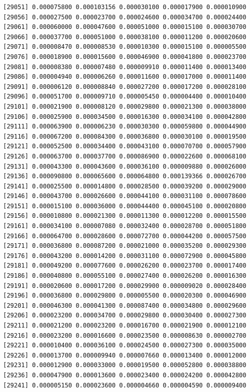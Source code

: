 \documentclass[]{article}
\begin{document}
\begin{verbatim}
[29051] 0.000075800 0.000103156 0.000030100 0.000017900 0.000010900
[29056] 0.000027500 0.000023700 0.000024600 0.000034700 0.000024400
[29061] 0.000060000 0.000047600 0.000051000 0.000015100 0.000030700
[29066] 0.000037700 0.000051000 0.000038100 0.000011200 0.000020600
[29071] 0.000008470 0.000008530 0.000010300 0.000015100 0.000005500
[29076] 0.000018900 0.000015600 0.000046900 0.000041800 0.000023700
[29081] 0.000008380 0.000007480 0.000009910 0.000011400 0.000013400
[29086] 0.000004940 0.000006260 0.000011600 0.000017000 0.000011400
[29091] 0.000006120 0.000008840 0.000027200 0.000017200 0.000028100
[29096] 0.000051700 0.000009710 0.000005450 0.000004400 0.000010400
[29101] 0.000021900 0.000008120 0.000029800 0.000021300 0.000038000
[29106] 0.000025900 0.000034500 0.000016300 0.000034100 0.000042800
[29111] 0.000063900 0.000006230 0.000030300 0.000059800 0.000044900
[29116] 0.000067200 0.000084300 0.000036800 0.000030100 0.000019500
[29121] 0.000052500 0.000034400 0.000043100 0.000070700 0.000057900
[29126] 0.000063700 0.000037700 0.000086900 0.000022600 0.000068100
[29131] 0.000043300 0.000043600 0.000036100 0.000009880 0.000026000
[29136] 0.000090800 0.000065600 0.000064800 0.000139366 0.000026700
[29141] 0.000025500 0.000014800 0.000028500 0.000039200 0.000029000
[29146] 0.000043700 0.000026600 0.000044100 0.000031100 0.000078600
[29151] 0.000015100 0.000036000 0.000044400 0.000045100 0.000020800
[29156] 0.000010800 0.000021300 0.000011300 0.000012200 0.000015500
[29161] 0.000034100 0.000007080 0.000032400 0.000028700 0.000051800
[29166] 0.000064700 0.000028600 0.000072700 0.000044200 0.000057500
[29171] 0.000036800 0.000087200 0.000021000 0.000035200 0.000029300
[29176] 0.000043200 0.000014200 0.000031100 0.000072900 0.000045800
[29181] 0.000049200 0.000077600 0.000026200 0.000023700 0.000017400
[29186] 0.000040800 0.000055100 0.000027400 0.000026200 0.000016300
[29191] 0.000020600 0.000017200 0.000029900 0.000009020 0.000028400
[29196] 0.000036800 0.000029800 0.000005500 0.000020300 0.000046900
[29201] 0.000046300 0.000041300 0.000087400 0.000034800 0.000029600
[29206] 0.000023200 0.000034700 0.000029800 0.000030400 0.000027300
[29211] 0.000021200 0.000023200 0.000016700 0.000021900 0.000012100
[29216] 0.000023200 0.000016600 0.000023500 0.000008630 0.000002700
[29221] 0.000010400 0.000036100 0.000024500 0.000027300 0.000035000
[29226] 0.000013700 0.000009940 0.000007660 0.000013400 0.000012000
[29231] 0.000012900 0.000033000 0.000019500 0.000052800 0.000038800
[29236] 0.000047900 0.000013600 0.000023400 0.000024200 0.000042800
[29241] 0.000005150 0.000023600 0.000004660 0.000004590 0.000009400

\end{verbatim}
\end{document}

